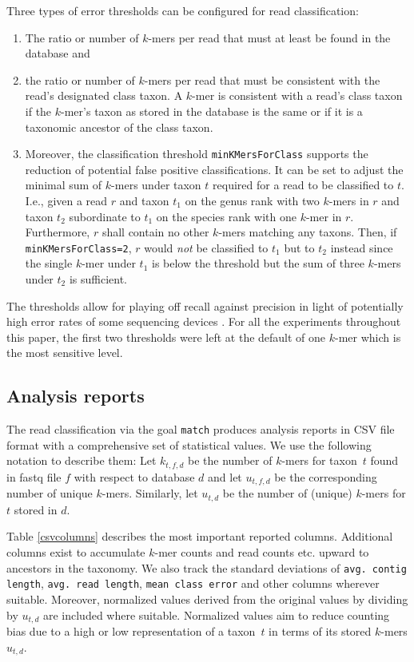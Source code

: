 \documentclass[pdflatex,sn-vancouver-num]{sn-jnl}
\newcommand{\taxon}{taxon}
\begin{document}
    Three types of error thresholds can be configured for read classification:
    \begin{enumerate}
        \item The ratio or number of $k$-mers per read that must at least be found in the database and
        \item the ratio or number of $k$-mers per read that must be consistent with the read's designated class taxon. A $k$-mer is consistent with a read's class taxon if the $k$-mer's taxon as stored in the database is the same or if it is a taxonomic ancestor of the class taxon.
        \item  Moreover, the classification threshold \verb|minKMersForClass| supports the reduction of potential false positive classifications. It can be set to adjust the minimal sum of $k$-mers under taxon $t$ required for a read to be classified to $t$. I.e., given a read $r$ and taxon $t_1$ on the genus rank with two $k$-mers in $r$ and taxon $t_2$ subordinate to $t_1$ on the species rank with one $k$-mer in $r$. Furthermore, $r$ shall contain no other $k$-mers matching any taxons. Then, if \verb|minKMersForClass=2|, $r$ would \emph{not} be classified to $t_1$ but to $t_2$ instead since the single $k$-mer under $t_1$ is below the threshold but the sum of three $k$-mers under $t_2$ is sufficient. 
    \end{enumerate}
    
    The thresholds allow for playing off recall against precision in light of potentially high error rates of some sequencing devices \citep{Delahaye:2021aa,Liu-Wei:2024aa}. For all the experiments throughout this paper, the first two thresholds were left at the default of one $k$-mer which is the most sensitive level.
    
    \subsection{Analysis reports} \label{measures}

    The read classification via the goal \verb|match| produces analysis reports in CSV file format with a comprehensive set of statistical values. We use the following notation to describe them: Let $k_{t,f,d}$ be the number of $k$-mers for \taxon\ $t$ found in fastq file $f$ with respect to database $d$ and let $u_{t,f,d}$ be the corresponding number of unique $k$-mers. Similarly, let $u_{t,d}$ be the number of (unique) $k$-mers for $t$ stored in $d$.

    Table \ref{csvcolumns} describes the most important reported columns. Additional columns exist to  accumulate $k$-mer counts and read counts etc. upward to ancestors in the taxonomy. We also track the standard deviations of \verb|avg. contig length|, \verb|avg. read length|, \verb|mean class error| and other columns wherever suitable. Moreover, normalized values derived from the original values by dividing by $u_{t,d}$ are included where suitable. Normalized values aim to reduce counting bias due to a high or low representation of a \taxon\ $t$ in terms of its stored $k$-mers $u_{t,d}$.
\end{document}
